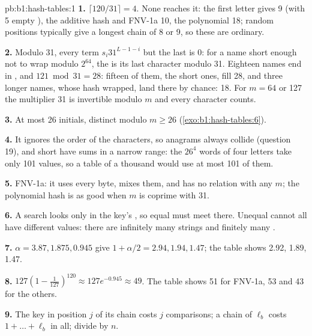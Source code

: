 \begin{solution}{pb:b1:hash-tables:1}
\textbf{1.} $\lceil 120/31 \rceil = 4$. None reaches it: the first letter gives 9 (with 5 empty ), the additive
hash and FNV-1a 10, the polynomial 18; random positions typically give a longest chain of 8 or 9, so these are ordinary.

\textbf{2.} Modulo 31, every term $s_i 31^{L-1-i}$ but the last is 0: for a name short enough not to wrap modulo
$2^{64}$, the  is its last character modulo 31. Eighteen names end in , and $121 \bmod 31 = 28$: fifteen
of them, the short ones, fill  28, and three longer names, whose hash wrapped, land there by chance: 18. For $m = 64$ or 127 the multiplier 31 is invertible modulo $m$ and every
character counts.

\textbf{3.} At most 26 initials, distinct modulo $m \geq 26$ (\cref{exo:b1:hash-tables:6}).

\textbf{4.} It ignores the order of the characters, so anagrams always collide (question 19), and short  have
sums in a narrow range: the $26^4$ words of four letters take only 101 values, so a table of a thousand  would use
at most 101 of them.

\textbf{5.} FNV-1a: it uses every byte, mixes them, and has no relation with any $m$; the polynomial hash is as good when
$m$ is coprime with 31.

\textbf{6.} A search looks only in the key's , so equal  must meet there. Unequal  cannot all have
different values: there are infinitely many strings and finitely many .

\textbf{7.} $\alpha = 3.87, 1.875, 0.945$ give $1 + \alpha/2 = 2.94, 1.94, 1.47$; the table shows 2.92, 1.89, 1.47.

\textbf{8.} $127(1 - \frac{1}{127})^{120} \approx 127 e^{-0.945} \approx 49$. The table shows 51 for FNV-1a, 53 and 43 for
the others.

\textbf{9.} The key in position $j$ of its chain costs $j$ comparisons; a chain of $\ell_b$  costs $1 + \dots +
\ell_b$ in all; divide by $n$.


\end{solution}
